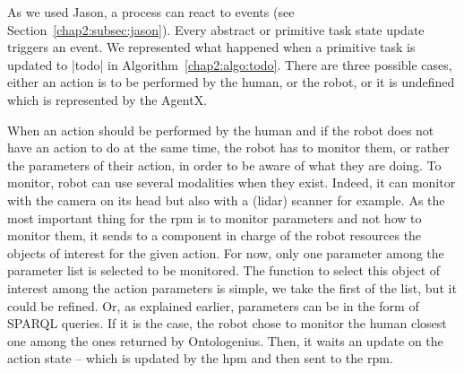 \documentclass[a4paper,11pt,twoside]{StyleThese}
\begin{document}
As we used Jason, a process can react to events (see Section~\ref{chap2:subsec:jason}). Every abstract or primitive task state update triggers an event. We represented what happened when a primitive task is updated to |todo| in Algorithm~\ref{chap2:algo:todo}. There are three possible cases, either an action is to be performed by the human, or the robot, or it is undefined which is represented by the AgentX. 

When an action should be performed by the human and if the robot does not have an action to do at the same time, the robot has to monitor them, or rather the parameters of their action, in order to be aware of what they are doing. To monitor, robot can use several modalities when they exist. Indeed, it can monitor with the camera on its head but also with a (lidar) scanner for example. As the most important thing for the \acrshort{rpm} is to monitor parameters and not how to monitor them, it sends to a component in charge of the robot resources the objects of interest for the given action. For now, only one parameter among the parameter list is selected to be monitored. The function to select this object of interest among the action parameters is simple, we take the first of the list, but it could be refined. Or, as explained earlier, parameters can be in the form of SPARQL queries. If it is the case, the robot chose to monitor the human closest one among the ones returned by Ontologenius. Then, it waits an update on the action state -- which is updated by the \acrfull{hpm} and then sent to the \acrshort{rpm}.
\end{document}
